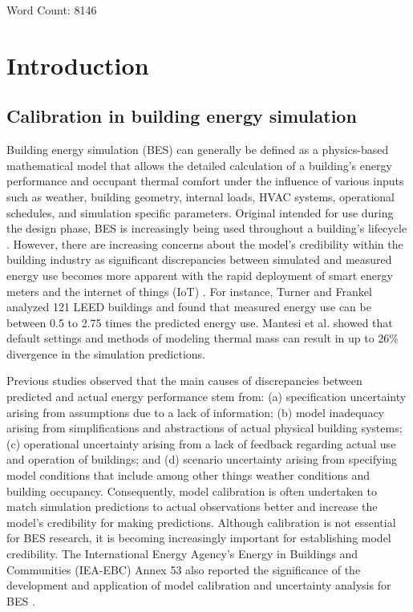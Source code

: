 \documentclass[review]{elsarticle}
\begin{document}
Word Count: 8146

\section{Introduction}

\subsection{Calibration in building energy simulation}
Building energy simulation (BES) can generally be defined as a physics-based mathematical model that allows the detailed calculation of a building's energy performance and occupant thermal comfort under the influence of various inputs such as weather, building geometry, internal loads, HVAC systems, operational schedules, and simulation specific parameters. Original intended for use during the design phase, BES is increasingly being used throughout a building's lifecycle \cite{hensen2019building}. However, there are increasing concerns about the model's credibility within the building industry as significant discrepancies between simulated and measured energy use becomes more apparent with the rapid deployment of smart energy meters and the internet of things (IoT) \cite{de2014gap}. For instance, Turner and Frankel \cite{turner2008energy} analyzed 121 LEED buildings and found that measured energy use can be between 0.5 to 2.75 times the predicted energy use. Mantesi et al. \cite{mantesi2018modelling} showed that default settings and methods of modeling thermal mass can result in up to 26\% divergence in the simulation predictions. 

Previous studies \cite{menezes2012predicted, de2002analysis} observed that the main causes of discrepancies between predicted and actual energy performance stem from: (a) specification uncertainty arising from assumptions due to a lack of information; (b) model inadequacy arising from simplifications and abstractions of actual physical building systems; (c) operational uncertainty arising from a lack of feedback regarding actual use and operation of buildings; and (d) scenario uncertainty arising from specifying model conditions that include among other things weather conditions and building occupancy. Consequently, model calibration is often undertaken to match simulation predictions to actual observations better and increase the model's credibility for making predictions. Although calibration is not essential for BES research, it is becoming increasingly important for establishing model credibility. The International Energy Agency's Energy in Buildings and Communities (IEA-EBC) Annex 53 also reported the significance of the development and application of model calibration and uncertainty analysis for BES \cite{yoshino2017iea}. 
\end{document}
